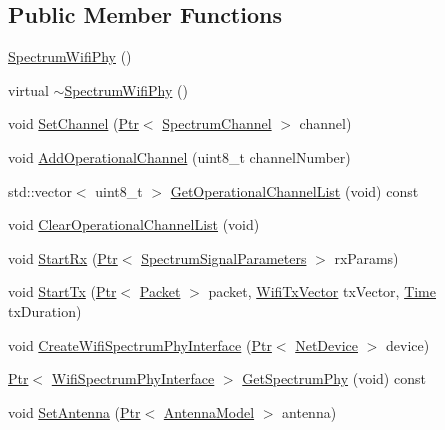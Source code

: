 \subsection*{Public Member Functions}
\begin{DoxyCompactItemize}
\item 
\hyperlink{classns3_1_1SpectrumWifiPhy_ac761f009c19b350fba26ddfbd2f1362d}{Spectrum\+Wifi\+Phy} ()
\item 
virtual \hyperlink{classns3_1_1SpectrumWifiPhy_ae0d612264f0fe17162feaf005b435045}{$\sim$\+Spectrum\+Wifi\+Phy} ()
\item 
void \hyperlink{classns3_1_1SpectrumWifiPhy_a14a2097a593f95c345c5f3a1793c6297}{Set\+Channel} (\hyperlink{classns3_1_1Ptr}{Ptr}$<$ \hyperlink{classns3_1_1SpectrumChannel}{Spectrum\+Channel} $>$ channel)
\item 
void \hyperlink{classns3_1_1SpectrumWifiPhy_a948c6d197accf2028529a2842ec68816}{Add\+Operational\+Channel} (uint8\+\_\+t channel\+Number)
\item 
std\+::vector$<$ uint8\+\_\+t $>$ \hyperlink{classns3_1_1SpectrumWifiPhy_acccc5334906573f2c79e2f9284100c5a}{Get\+Operational\+Channel\+List} (void) const 
\item 
void \hyperlink{classns3_1_1SpectrumWifiPhy_acb3f2f3a32236fa5fdeed1986b28fe04}{Clear\+Operational\+Channel\+List} (void)
\item 
void \hyperlink{classns3_1_1SpectrumWifiPhy_aead1ebdbaf59361928cd6ffa7abc3161}{Start\+Rx} (\hyperlink{classns3_1_1Ptr}{Ptr}$<$ \hyperlink{structns3_1_1SpectrumSignalParameters}{Spectrum\+Signal\+Parameters} $>$ rx\+Params)
\item 
void \hyperlink{classns3_1_1SpectrumWifiPhy_ae0e6d5affdd06543c8fcfed2959e438a}{Start\+Tx} (\hyperlink{classns3_1_1Ptr}{Ptr}$<$ \hyperlink{classns3_1_1Packet}{Packet} $>$ packet, \hyperlink{classns3_1_1WifiTxVector}{Wifi\+Tx\+Vector} tx\+Vector, \hyperlink{classns3_1_1Time}{Time} tx\+Duration)
\item 
void \hyperlink{classns3_1_1SpectrumWifiPhy_aff75ea7c57389e929f1cf0743ce83663}{Create\+Wifi\+Spectrum\+Phy\+Interface} (\hyperlink{classns3_1_1Ptr}{Ptr}$<$ \hyperlink{classns3_1_1NetDevice}{Net\+Device} $>$ device)
\item 
\hyperlink{classns3_1_1Ptr}{Ptr}$<$ \hyperlink{classns3_1_1WifiSpectrumPhyInterface}{Wifi\+Spectrum\+Phy\+Interface} $>$ \hyperlink{classns3_1_1SpectrumWifiPhy_a7ef3e2412c0bbdcaa643c63f0d74c190}{Get\+Spectrum\+Phy} (void) const 
\item 
void \hyperlink{classns3_1_1SpectrumWifiPhy_a88b77aa3e375c573bd5ae5cf42cea91f}{Set\+Antenna} (\hyperlink{classns3_1_1Ptr}{Ptr}$<$ \hyperlink{classns3_1_1AntennaModel}{Antenna\+Model} $>$ antenna)

\end{DoxyCompactItemize}

